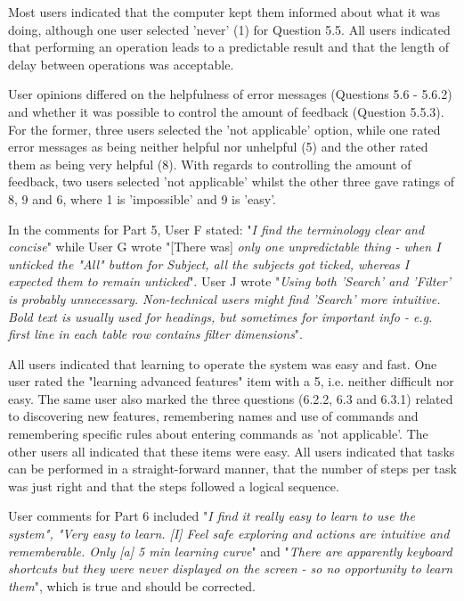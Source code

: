 Most users indicated that the computer kept them informed about what it was doing, although one user selected 'never' (1) for Question 5.5. All users indicated that performing an operation leads to a predictable result and that the length of delay between operations was acceptable. 

User opinions differed on the helpfulness of error messages (Questions 5.6 - 5.6.2) and whether it was possible to control the amount of feedback (Question 5.5.3). For the former, three users selected the 'not applicable' option, while one rated error messages as being neither helpful nor unhelpful (5) and the other rated them as being very helpful (8). With regards to controlling the amount of feedback, two users selected 'not applicable' whilst the other three gave ratings of 8, 9 and 6, where 1 is 'impossible' and 9 is 'easy'.

In the comments for Part 5, User F stated: "\textit{I find the terminology clear and concise}" while User G wrote "[There was] \textit{only one unpredictable thing - when I unticked the "All" button for Subject, all the subjects got ticked, whereas I expected them to remain unticked}". User J wrote "\textit{Using both 'Search' and 'Filter' is probably unnecessary. Non-technical users might find 'Search' more intuitive. Bold text is usually used for headings, but sometimes for important info - e.g. first line in each table row contains filter dimensions}".

All users indicated that learning to operate the system was easy and fast. One user rated the "learning advanced features" item with a 5, i.e. neither difficult nor easy. The same user also marked the three questions (6.2.2, 6.3 and 6.3.1) related to discovering new features, remembering names and use of commands and remembering specific rules about entering commands as 'not applicable'. The other users all indicated that these items were easy. All users indicated that tasks can be performed in a straight-forward manner, that the number of  steps per task was just right and that the steps followed a logical sequence. 

User comments for Part 6 included "\textit{I find it really easy to learn to use the system", "Very easy to learn. [I] Feel safe exploring and actions are intuitive and rememberable. Only [a] 5 min learning curve}" and "\textit{There are apparently keyboard shortcuts but they were never displayed on the screen - so no opportunity to learn them}", which is true and should be corrected.

